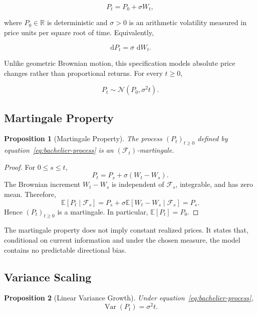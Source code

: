 \documentclass[11pt,a4paper]{article}
\newtheorem{proposition}{Proposition}
\DeclareMathOperator{\Var}{Var}
\newcommand{\E}{\mathbb{E}}
\newcommand{\dd}{\,\mathrm{d}}
\begin{document}
\begin{equation}
P_t=P_0+\sigma W_t,
\label{eq:bachelier-process}
\end{equation}

where \(P_0\in\mathbb{R}\) is deterministic and \(\sigma>0\) is an arithmetic volatility measured in price units per square root of time. Equivalently,

\begin{equation}
\dd P_t=\sigma\,\dd W_t.
\label{eq:bachelier-sde}
\end{equation}

Unlike geometric Brownian motion, this specification models absolute price changes rather than proportional returns. For every \(t\geq0\),

\begin{equation}
P_t\sim\mathcal{N}(P_0,\sigma^2t).
\label{eq:normal-price-distribution}
\end{equation}

\subsection{Martingale Property}

\begin{proposition}[Martingale Property]
The process \((P_t)_{t\geq0}\) defined by equation~\eqref{eq:bachelier-process} is an \((\mathcal{F}_t)\)-martingale.
\end{proposition}

\begin{proof}
For \(0\leq s\leq t\),
\[
P_t=P_s+\sigma(W_t-W_s).
\]
The Brownian increment \(W_t-W_s\) is independent of \(\mathcal{F}_s\), integrable, and has zero mean. Therefore,
\[
\E[P_t\mid\mathcal{F}_s]
=P_s+\sigma\E[W_t-W_s\mid\mathcal{F}_s]
=P_s.
\]
Hence \((P_t)_{t\geq0}\) is a martingale. In particular, \(\E[P_t]=P_0\).
\end{proof}

The martingale property does not imply constant realized prices. It states that, conditional on current information and under the chosen measure, the model contains no predictable directional bias.

\subsection{Variance Scaling}

\begin{proposition}[Linear Variance Growth]
Under equation~\eqref{eq:bachelier-process},
\[
\Var(P_t)=\sigma^2t.
\]
\end{proposition}
\end{document}
